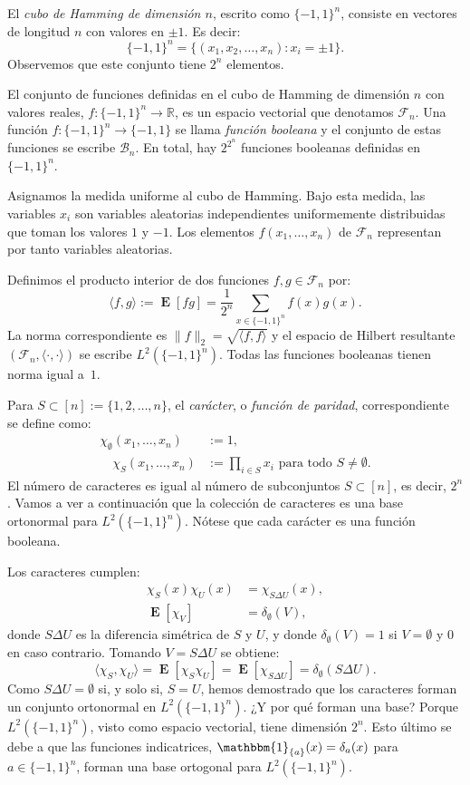 \documentclass[autocontact]{gaceta}
\newcommand{\R}{\mathbb{R}}
\DeclareMathOperator{\EE}{\mathbf{E}}
\begin{document}
El \emph{cubo de Hamming de dimensión $n$}, escrito como $\{-1,1\}^n$, consiste en vectores de longitud $n$ con valores en $\pm 1$. Es decir:
\[
\{-1,1\}^{n}=\{ (x_1,x_2,\dots,x_n): x_i=\pm 1\}.
\]
Observemos que este conjunto tiene $2^n$ elementos.

El conjunto de funciones definidas en el cubo de Hamming de dimensión $n$ con valores reales, $f:\{-1,1\}^{n} \to \R$, es un espacio vectorial que denotamos $\mathcal{F}_n$. Una función $f:\{-1,1\}^{n} \to \{-1,1\}$ se llama \emph{función booleana} y el conjunto de estas funciones se escribe $\mathcal{B}_n$. En total, hay $2^{2^n}$ funciones booleanas definidas en $\{-1,1\}^n$.

Asignamos la medida uniforme al cubo de Hamming. Bajo esta medida, las variables $x_i$ son variables aleatorias independientes uniformemente distribuidas que toman los valores $1$ y $-1$. Los elementos $f(x_1,\dots, x_n)$ de $\mathcal{F}_n$ representan por tanto variables aleatorias.

Definimos el producto interior de dos funciones $f, g \in \mathcal{F}_n$ por:
\[
\langle f,g\rangle := \EE[fg]= \frac{1}{2^n} \sum_{x\in \{-1,1\}^{n}}f(x)g(x).
\]
La norma correspondiente es $\|f\|_2=\sqrt{\langle f,f\rangle}$ y el espacio de Hilbert resultante $(\mathcal{F}_n, \langle \cdot , \cdot \rangle)$ se escribe $L^2(\{-1,1\}^n)$. Todas las funciones booleanas tienen norma igual a~$1$.

Para $S\subset [n]:=\{1,2,\dots ,n\}$, el \emph{carácter}, o \emph{función de paridad}, correspondiente se define como:
\begin{align*}
 \chi_{\emptyset}(x_1,\dots,x_n) &:=1,
 \\
 \quad \chi_S(x_1,\dots,x_n) &:=\prod_{i\in S} x_i \text{ para todo } S\neq \emptyset.
\end{align*}
El número de caracteres es igual al número de subconjuntos $S\subset [n]$, es decir, $2^n$. Vamos a ver a continuación que la colección de caracteres es una base ortonormal para $L^2(\{-1,1\}^n)$. Nótese que cada carácter es una función booleana.

Los caracteres cumplen:
\begin{align*}
\chi_S(x)\chi_U(x)&=\chi_{S\Delta U}(x),
\\
\EE[\chi_V] &= \delta_{\emptyset}(V),
\end{align*}
donde $S\Delta U$ es la diferencia simétrica de $S$ y $U$, y donde $\delta_{\emptyset}(V)=1$ si $V=\emptyset$ y $0$ en caso contrario. Tomando $V=S\Delta U$ se obtiene:
\[
\langle \chi_S,\chi_U\rangle = \EE[\chi_S \chi_U] =
\EE[\chi_{S\Delta U}] = \delta_{\emptyset}(S\Delta U).
\]
Como $S \Delta U=\emptyset$ si, y solo si, $S=U$, hemos demostrado que los caracteres forman un conjunto ortonormal en $L^2(\{-1,1\}^n)$. ¿Y por qué forman una base? Porque $L^2(\{-1,1\}^n)$, visto como espacio vectorial, tiene dimensión $2^n$. Esto último se debe a que las funciones indicatrices, $\mathbbm{1}_{\{a\}}(x)=\delta_a(x)$ para $a\in \{-1,1\}^n$, forman una base ortogonal para $L^2(\{-1,1\}^n)$.
\end{document}
